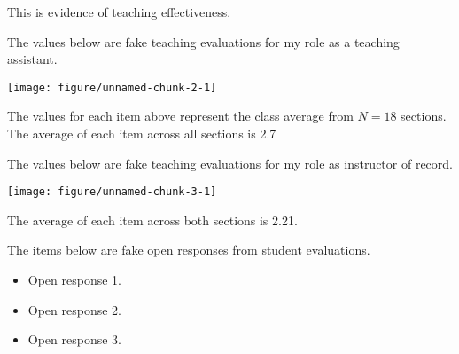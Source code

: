 \documentclass[12pt]{article}\usepackage[]{graphicx}\usepackage[]{color}
\newenvironment{knitrout}{}{} %
\begin{document}
 \pagestyle{plain}





This is evidence of teaching effectiveness.







The values below are fake teaching evaluations for my role as a teaching assistant.



\begin{knitrout}
\color{fgcolor}

\hfill{}\texttt{[image: figure/unnamed-chunk-2-1]} 



\end{knitrout}



The values for each item above represent the class average from $N = 18$ sections. The average of each item across all sections is 2.7



The values below are fake teaching evaluations for my role as instructor of record.



\begin{knitrout}
\color{fgcolor}

\hfill{}\texttt{[image: figure/unnamed-chunk-3-1]} 



\end{knitrout}



The average of each item across both sections is 2.21.



The items below are fake open responses from student evaluations.



\begin{itemize}
	\item Open response 1.
	\item Open response 2.
	\item Open response 3.
\end{itemize}



\end{document}
